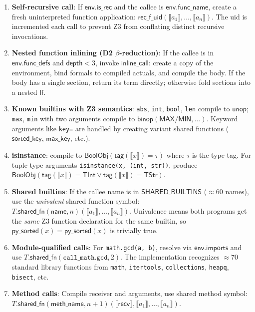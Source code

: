 \documentclass[11pt,a4paper]{report}
\theoremstyle{definition}
\theoremstyle{plain}
\newcommand{\den}[1]{\llbracket #1 \rrbracket}
\begin{document}
\begin{enumerate}
  \item \textbf{Self-recursive call}: If $\mathsf{env.is\_rec}$ and the
    callee is $\mathsf{env.func\_name}$, create a fresh uninterpreted
    function application:
    $\mathsf{rec\_f\_uid}(\den{a_1}, \ldots, \den{a_n})$.
    The uid is incremented each call to prevent Z3 from
    conflating distinct recursive invocations.

  \item \textbf{Nested function inlining (D2 $\beta$-reduction)}:
    If the callee is in $\mathsf{env.func\_defs}$ and
    $\mathsf{depth} < 3$, invoke
    $\mathsf{inline\_call}$: create a copy of the environment,
    bind formals to compiled actuals, and compile the body.
    If the body has a single section, return its term directly;
    otherwise fold sections into a nested $\mathsf{If}$.

  \item \textbf{Known builtins with Z3 semantics}: \texttt{abs},
    \texttt{int}, \texttt{bool}, \texttt{len} compile to
    $\mathsf{unop}$; \texttt{max}, \texttt{min} with two arguments
    compile to $\mathsf{binop}(\mathsf{MAX}/\mathsf{MIN}, \ldots)$.
    Keyword arguments like \texttt{key=} are handled by creating
    variant shared functions
    ($\mathsf{sorted\_key}$, $\mathsf{max\_key}$, etc.).

  \item \textbf{isinstance}: compile to
    $\mathsf{BoolObj}(\mathsf{tag}(\den{x}) = \tau)$ where $\tau$
    is the type tag.  For tuple type arguments
    \texttt{isinstance(x, (int, str))}, produce
    $\mathsf{BoolObj}(\mathsf{tag}(\den{x}) = \mathsf{TInt}
    \lor \mathsf{tag}(\den{x}) = \mathsf{TStr})$.

  \item \textbf{Shared builtins}: If the callee name is in
    $\mathsf{SHARED\_BUILTINS}$ ($\approx$60 names), use the
    \emph{univalent} shared function symbol:
    $T.\mathsf{shared\_fn}(\mathsf{name}, n)(\den{a_1}, \ldots,
    \den{a_n})$.
    Univalence means both programs get the \emph{same} Z3 function
    declaration for the same builtin, so
    $\mathsf{py\_sorted}(x) = \mathsf{py\_sorted}(x)$ is trivially
    true.

  \item \textbf{Module-qualified calls}: For \texttt{math.gcd(a, b)},
    resolve via $\mathsf{env.imports}$ and use
    $T.\mathsf{shared\_fn}(\texttt{call\_math.gcd}, 2)$.
    The implementation recognizes $\approx$70 standard library
    functions from \texttt{math}, \texttt{itertools},
    \texttt{collections}, \texttt{heapq}, \texttt{bisect}, etc.

  \item \textbf{Method calls}: Compile receiver and arguments, use
    shared method symbol:
    $T.\mathsf{shared\_fn}(\mathsf{meth\_name}, n+1)(\den{\mathsf{recv}},
    \den{a_1}, \ldots, \den{a_n})$.
\end{enumerate}
\end{document}
